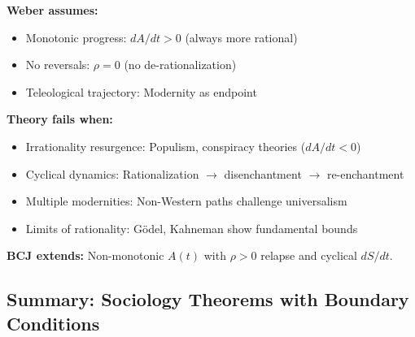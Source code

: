 \begin{tcolorbox}[colback=red!5!white, colframe=red!75!black,
    title=Boundary Condition: Where Weber Fails]
\textbf{Weber assumes:}
\begin{itemize}[nosep]
\item Monotonic progress: $dA/dt > 0$ (always more rational)
\item No reversals: $\rho = 0$ (no de-rationalization)
\item Teleological trajectory: Modernity as endpoint
\end{itemize}

\textbf{Theory fails when:}
\begin{itemize}[nosep]
\item Irrationality resurgence: Populism, conspiracy theories ($dA/dt < 0$)
\item Cyclical dynamics: Rationalization $\to$ disenchantment $\to$ re-enchantment
\item Multiple modernities: Non-Western paths challenge universalism
\item Limits of rationality: Gödel, Kahneman show fundamental bounds
\end{itemize}

\textbf{BCJ extends:} Non-monotonic $A(t)$ with $\rho > 0$ relapse and cyclical $dS/dt$.
\end{tcolorbox}


\subsection{Summary: Sociology Theorems with Boundary Conditions}

